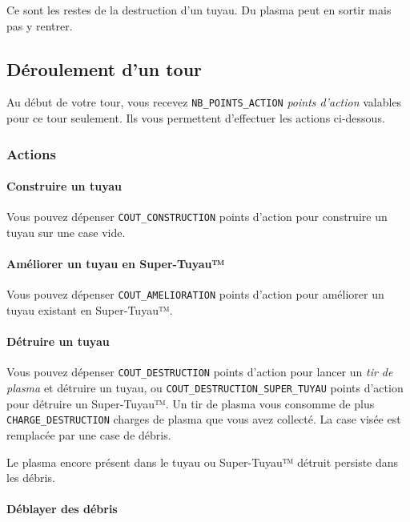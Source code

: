 Ce sont les restes de la destruction d'un tuyau. Du plasma peut en
sortir mais pas y rentrer.

\subsection{Déroulement d'un tour}\label{duxe9roulement-dun-tour}

Au début de votre tour, vous recevez \texttt{NB\_POINTS\_ACTION}
\emph{points d'action} valables pour ce tour seulement. Ils vous
permettent d'effectuer les actions ci-dessous.

\subsubsection{Actions}\label{actions}

\paragraph{Construire un tuyau}\label{construire-un-tuyau}

Vous pouvez dépenser \texttt{COUT\_CONSTRUCTION} points d'action pour
construire un tuyau sur une case vide.

\paragraph{Améliorer un tuyau en
Super-Tuyau™}\label{amuxe9liorer-un-tuyau-en-super-tuyau}

Vous pouvez dépenser \texttt{COUT\_AMELIORATION} points d'action pour
améliorer un tuyau existant en Super-Tuyau™.

\paragraph{Détruire un tuyau}\label{duxe9truire-un-tuyau}

Vous pouvez dépenser \texttt{COUT\_DESTRUCTION} points d'action pour
lancer un \emph{tir de plasma} et détruire un tuyau, ou
\texttt{COUT\_DESTRUCTION\_SUPER\_TUYAU} points d'action pour détruire
un Super-Tuyau™. Un tir de plasma vous consomme de plus
\texttt{CHARGE\_DESTRUCTION} charges de plasma que vous avez collecté.
La case visée est remplacée par une case de débris.

Le plasma encore présent dans le tuyau ou Super-Tuyau™ détruit persiste
dans les débris.

\paragraph{Déblayer des débris}\label{duxe9blayer-des-duxe9bris}

